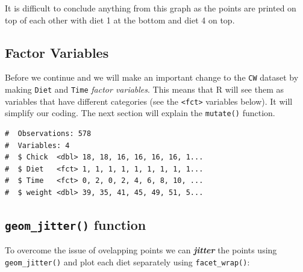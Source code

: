 \documentclass[a4paper,9pt,twocolumn,twoside,printwatermark=false]{pinp}
\begin{document}
It is difficult to conclude anything from this graph as the points are
printed on top of each other with diet 1 at the bottom and diet 4 on
top.

\subsection{Factor Variables}\label{factor-variables}

Before we continue and we will make an important change to the
\texttt{CW} dataset by making \texttt{Diet} and \texttt{Time}
\emph{factor variables}. This means that R will see them as variables
that have different categories (see the
\texttt{\textless{}fct\textgreater{}} variables below). It will simplify
our coding. The next section will explain the \texttt{mutate()}
function.

\begin{Shaded}
\begin{Highlighting}[]
\StringTok{ } 
\StringTok{ } 
\end{Highlighting}
\end{Shaded}

\begin{ShadedResult}
\begin{verbatim}
#  Observations: 578
#  Variables: 4
#  $ Chick  <dbl> 18, 18, 16, 16, 16, 16, 1...
#  $ Diet   <fct> 1, 1, 1, 1, 1, 1, 1, 1, 1...
#  $ Time   <fct> 0, 2, 0, 2, 4, 6, 8, 10, ...
#  $ weight <dbl> 39, 35, 41, 45, 49, 51, 5...
\end{verbatim}
\end{ShadedResult}

\subsection{\texorpdfstring{\texttt{geom\_jitter()}
function}{geom\_jitter() function}}\label{geom_jitter-function}

To overcome the issue of ovelapping points we can \textbf{\emph{jitter}}
the points using \texttt{geom\_jitter()} and plot each diet separately
using \texttt{facet\_wrap()}:

\begin{Shaded}
\begin{Highlighting}[]
\OperatorTok{+}
\StringTok{  }\NormalTok{() }\OperatorTok{+}
\StringTok{  }\NormalTok{(}\OperatorTok{~}\OperatorTok{+}
\StringTok{  }\NormalTok{(} \NormalTok{)}
\end{Highlighting}
\end{Shaded}
\end{document}

